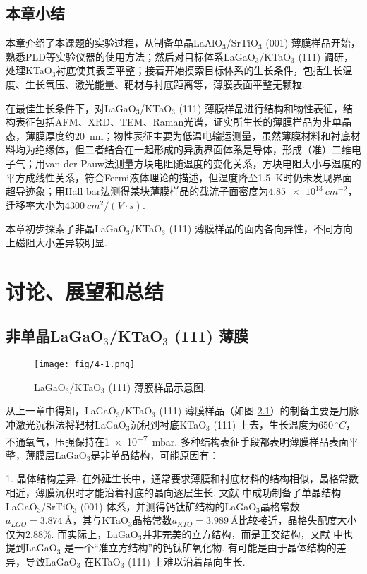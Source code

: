 \documentclass[12pt,a4paper,openany,twoside,UTF-8]{book}
\begin{document}
\section{本章小结}
本章介绍了本课题的实验过程，从制备单晶LaAlO$_3$/SrTiO$_3$ (001) 薄膜样品开始，熟悉PLD等实验仪器的使用方法；然后对目标体系LaGaO$_3$/KTaO$_3$ (111) 调研，处理KTaO$_3$衬底使其表面平整；接着开始摸索目标体系的生长条件，包括生长温度、生长氧压、激光能量、靶材与衬底距离等，薄膜表面平整无颗粒.

在最佳生长条件下，对LaGaO$_3$/KTaO$_3$ (111) 薄膜样品进行结构和物性表征，结构表征包括AFM、XRD、TEM、Raman光谱，证实所生长的薄膜样品为非单晶态，薄膜厚度约\SI{20}{nm}；物性表征主要为低温电输运测量，虽然薄膜材料和衬底材料均为绝缘体，但二者结合在一起形成的异质界面体系是导体，形成（准）二维电子气；用van der Pauw法测量方块电阻随温度的变化关系，方块电阻大小与温度的平方成线性关系，符合Fermi液体理论的描述，但温度降至\SI{1.5}{K}时仍未发现界面超导迹象；用Hall bar法测得某块薄膜样品的载流子面密度为$\SI{4.85e13}{cm^{-2}}$，迁移率大小为$\SI{4300}{cm^2/(V\cdot s)}$. 

本章初步探索了非晶LaGaO$_3$/KTaO$_3$ (111) 薄膜样品的面内各向异性，不同方向上磁阻大小差异较明显.



\chapter{讨论、展望和总结}

\section{非单晶LaGaO$_3$/KTaO$_3$ (111) 薄膜}
\begin{figure}[htbp]
\centering
\texttt{[image: fig/4-1.png]}
\caption{LaGaO$_3$/KTaO$_3$ (111) 薄膜样品示意图.}
\label{fig:4-1} 
\end{figure}

从上一章中得知，LaGaO$_3$/KTaO$_3$ (111) 薄膜样品（如图 \ref{fig:4-1}）的制备主要是用脉冲激光沉积法将靶材LaGaO$_3$沉积到衬底KTaO$_3$ (111) 上去，生长温度为$\SI{650}{^\circ C}$，不通氧气，压强保持在\SI{1e-7}{mbar}. 多种结构表征手段都表明薄膜样品表面平整，薄膜层LaGaO$_3$是非单晶结构，可能原因有：

1. 晶体结构差异. 在外延生长中，通常要求薄膜和衬底材料的结构相似，晶格常数相近，薄膜沉积时才能沿着衬底的晶向逐层生长. 文献 \cite{ref36}中成功制备了单晶结构LaGaO$_3$/SrTiO$_3$ (001) 体系，并测得钙钛矿结构的LaGaO$_3$晶格常数$a_{LGO} = \SI{3.874}{Å}$，其与KTaO$_3$晶格常数$a_{KTO} = \SI{3.989}{Å}$比较接近，晶格失配度大小仅为$2.88\%$. 而实际上，LaGaO$_3$并非完美的立方结构，而是正交结构，文献 \cite{ref36}中也提到LaGaO$_3$ 是一个“准立方结构”的钙钛矿氧化物. 有可能是由于晶体结构的差异，导致LaGaO$_3$ 在KTaO$_3$ (111) 上难以沿着晶向生长.
\end{document}
